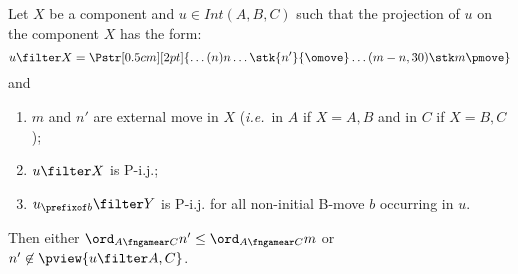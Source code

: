 \begin{lemma}
\label{lem:compos_auxiliary_lemma}
Let $X$ be a component and $u \in Int(A,B,C)$ such that
the projection of $u$ on the component $X$ has the form:
$$ u \filter X =
\Pstr[0.5cm][2pt]{ \ldots (n){n}  \ldots
 {\stk {n'}{\omove}}  \ldots  (m-n,30){\stk m {\pmove}}
}$$
and
\begin{enumerate}
  \item $m$ and $n'$ are external move in $X$ ({\it i.e.}~in $A$ if $X =A,B$ and in $C$ if $X=B,C$);
  \item $u\filter X$ is P-i.j.;
  \item $u_{\prefixof b}\filter Y$ is P-i.j. for all non-initial B-move $b$ occurring in $u$.
\end{enumerate}
Then either $\ord_{A\fngamear C} n' \leq \ord_{A\fngamear C} m$ or $n' \not \in \pview{u\filter A,C}$.
\end{lemma}
